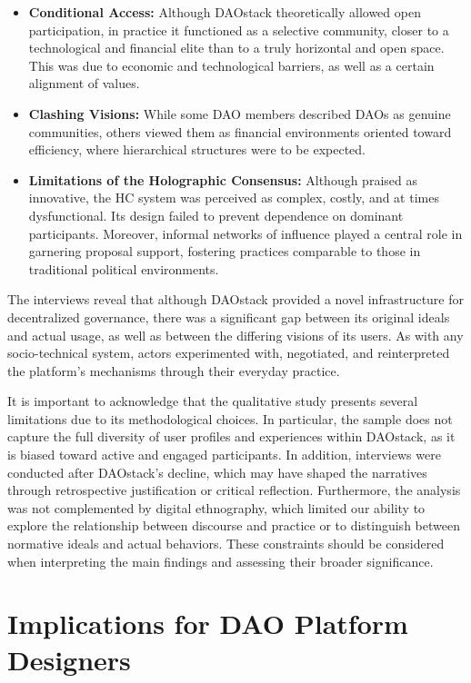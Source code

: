\documentclass[10pt,lineno]{wlpeerj}
\begin{document}
\begin{itemize}
    \item \textbf{Conditional Access:} Although DAOstack theoretically allowed open participation, in practice it functioned as a selective community, closer to a technological and financial elite than to a truly horizontal and open space. This was due to economic and technological barriers, as well as a certain alignment of values.

    \item \textbf{Clashing Visions:} While some DAO members described DAOs as genuine communities, others viewed them as financial environments oriented toward efficiency, where hierarchical structures were to be expected. 

    \item \textbf{Limitations of the Holographic Consensus:} Although praised as innovative, the HC system was perceived as complex, costly, and at times dysfunctional. Its design failed to prevent dependence on dominant participants. Moreover, informal networks of influence played a central role in garnering proposal support, fostering practices comparable to those in traditional political environments.
\end{itemize}

The interviews reveal that although DAOstack provided a novel infrastructure for decentralized governance, there was a significant gap between its original ideals and actual usage, as well as between the differing visions of its users. As with any socio-technical system, actors experimented with, negotiated, and reinterpreted the platform’s mechanisms through their everyday practice.

It is important to acknowledge that the qualitative study presents several limitations due to its methodological choices. In particular, the sample does not capture the full diversity of user profiles and experiences within DAOstack, as it is biased toward active and engaged participants. In addition, interviews were conducted after DAOstack’s decline, which may have shaped the narratives through retrospective justification or critical reflection. Furthermore, the analysis was not complemented by digital ethnography, which limited our ability to explore the relationship between discourse and practice or to distinguish between normative ideals and actual behaviors. These constraints should be considered when interpreting the main findings and assessing their broader significance.


\section{Implications for DAO Platform Designers}
\end{document}
